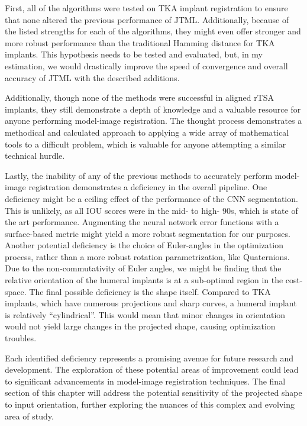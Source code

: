 First, all of the algorithms were tested on TKA implant registration to ensure that none altered the previous performance of JTML.
Additionally, because of the listed strengths for each of the algorithms, they might even offer stronger and more robust performance than the traditional Hamming distance for TKA implants.
This hypothesis needs to be tested and evaluated, but, in my estimation, we would drastically improve the speed of convergence and overall accuracy of JTML with the described additions.

Additionally, though none of the methods were successful in aligned rTSA implants, they still demonstrate a depth of knowledge and a valuable resource for anyone performing model-image registration.
The thought process demonstrates a methodical and calculated approach to applying a wide array of mathematical tools to a difficult problem, which is valuable for anyone attempting a similar technical hurdle.

Lastly, the inability of any of the previous methods to accurately perform model-image registration demonstrates a deficiency in the overall pipeline.
One deficiency might be a ceiling effect of the performance of the CNN segmentation.
This is unlikely, as all IOU scores were in the mid- to high- 90s, which is state of the art performance.
Augmenting the neural network error functions with a surface-based metric might yield a more robust segmentation for our purposes.
Another potential deficiency is the choice of Euler-angles in the optimization process, rather than a more robust rotation parametrization, like Quaternions.
Due to the non-commutativity of Euler angles, we might be finding that the relative orientation of the humeral implants is at a sub-optimal region in the cost-space.
The final possible deficiency is the shape itself.
Compared to TKA implants, which have numerous projections and sharp curves, a humeral implant is relatively ``cylindrical''.
This would mean that minor changes in orientation would not yield large changes in the projected shape, causing optimization troubles.

Each identified deficiency represents a promising avenue for future research and development.
The exploration of these potential areas of improvement could lead to significant advancements in model-image registration techniques.
The final section of this chapter will address the potential sensitivity of the projected shape to input orientation, further exploring the nuances of this complex and evolving area of study.


